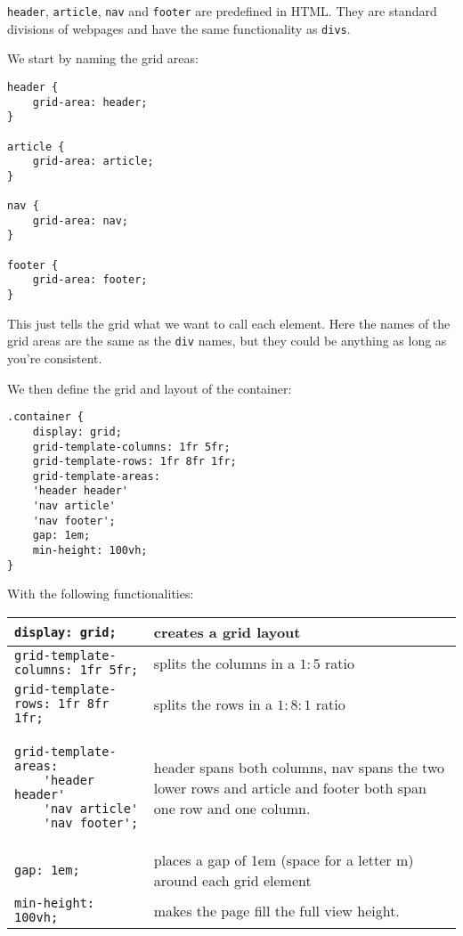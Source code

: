 \documentclass[english,11pt,a4paper]{report}
\begin{document}
\verb|header|, \verb|article|, \verb|nav| and \verb|footer| are predefined in HTML. They are standard divisions of webpages and have the same functionality as \verb|divs|.

We start by naming the grid areas: 
\begin{lstlisting}
header {
    grid-area: header;
}

article {
    grid-area: article;
}

nav {
    grid-area: nav;
}

footer {
    grid-area: footer;
}
\end{lstlisting}
This just tells the grid what we want to call each element. Here the names of the grid areas are the same as the \verb|div| names, but they could be anything as long as you're consistent.

We then define the grid and layout of the container: 
\begin{lstlisting}
.container {
    display: grid;
    grid-template-columns: 1fr 5fr;
    grid-template-rows: 1fr 8fr 1fr;
    grid-template-areas: 
    'header header'
    'nav article'
    'nav footer';
    gap: 1em;
    min-height: 100vh;
}
\end{lstlisting}
With the following functionalities: 
\begin{center}
\begin{tabular}{p{}|p{}}
\verb|display: grid;| & creates a grid layout \\
\hline
\verb|grid-template-columns: 1fr 5fr;| & splits the columns in a $1:5$ ratio \\
\hline
\verb|grid-template-rows: 1fr 8fr 1fr;| & splits the rows in a $1:8:1$ ratio \\
\hline
\begin{verbatim}
grid-template-areas: 
    'header header'
    'nav article'
    'nav footer';
\end{verbatim} & header spans both columns,  
nav spans the two lower rows 
and article and footer both span one row and one column.  \\
\hline
\verb|gap: 1em;| & places a gap of 1em (space for a letter m) around each grid element\\
\hline
\verb|min-height: 100vh;| & makes the page fill the full view height.
\end{tabular}
\end{center}
\end{document}
